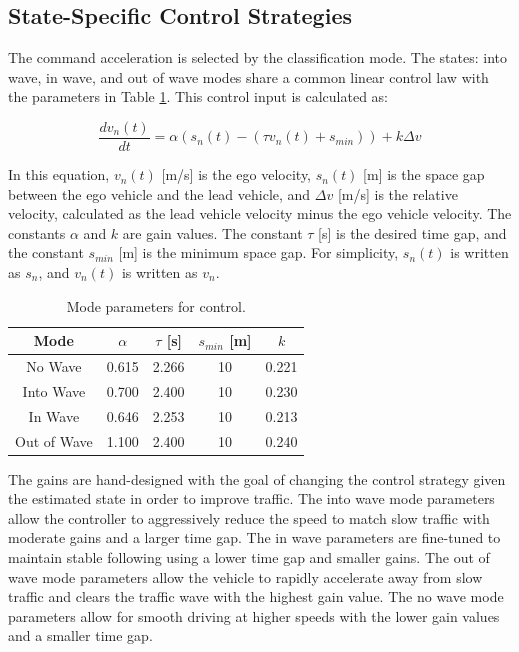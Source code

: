 \documentclass[conference]{IEEEtran}
\newcommand{\kibitz}[2]{\ifnum\Comments=1\textcolor{#1}{#2}\fi}
\newcommand{\jms}[1]{\kibitz{darkgreen}      {[JMS: #1]}}
\begin{document}
\subsection{State-Specific Control Strategies}

The command acceleration is selected by the classification mode. The states: into wave, in wave, and out of wave modes share a common linear control law with the parameters in Table \ref{tab:mode_param}. This control input is calculated as:

\begin{equation}\label{eq:control}
    \frac{dv_n(t)}{dt} = \alpha (s_n(t)-(\tau v_n(t) + s_{min})) + k \Delta v
\end{equation}

In this equation, $v_n(t)$ [m/s] is the ego velocity, $s_n(t)$ [m] is the space gap between the ego vehicle and the lead vehicle, and $\Delta v$ [m/s] is the relative velocity, calculated as the lead vehicle velocity minus the ego vehicle velocity. The constants $\alpha$ and $k$ are gain values. The constant $\tau$ [s] is the desired time gap, and the constant $s_{min}$ [m] is the minimum space gap. For simplicity, $s_n(t)$ is written as $s_n$, and $v_n(t)$ is written as $v_n$.


\begin{table}[htbp]
\caption{Mode parameters for control.}
\begin{center}
\begin{tabular}{|c|c|c|c|c|}
\hline
Mode & $\alpha$ & $\tau$ [s] & $s_{min}$ [m] & $k$ \\
\hline
No Wave & 0.615 & 2.266 & 10 & 0.221 \\
\hline
Into Wave & 0.700 & 2.400 & 10 & 0.230 \\
\hline
In Wave & 0.646 & 2.253 & 10 & 0.213 \\
\hline
Out of Wave & 1.100 & 2.400 & 10 & 0.240 \\
\hline
\end{tabular}
\label{tab:mode_param}
\end{center}
\end{table}

The gains are hand-designed with the goal of changing the control strategy given the estimated state in order to improve traffic. The into wave mode parameters allow the controller to aggressively reduce the speed to match slow traffic with moderate gains and a larger time gap. The in wave parameters are fine-tuned to maintain stable following using a lower time gap and smaller gains. The out of wave mode parameters allow the vehicle to rapidly accelerate away from slow traffic and clears the traffic wave with the highest gain value. The no wave mode parameters allow for smooth driving at higher speeds with the lower gain values and a smaller time gap.
\end{document}
